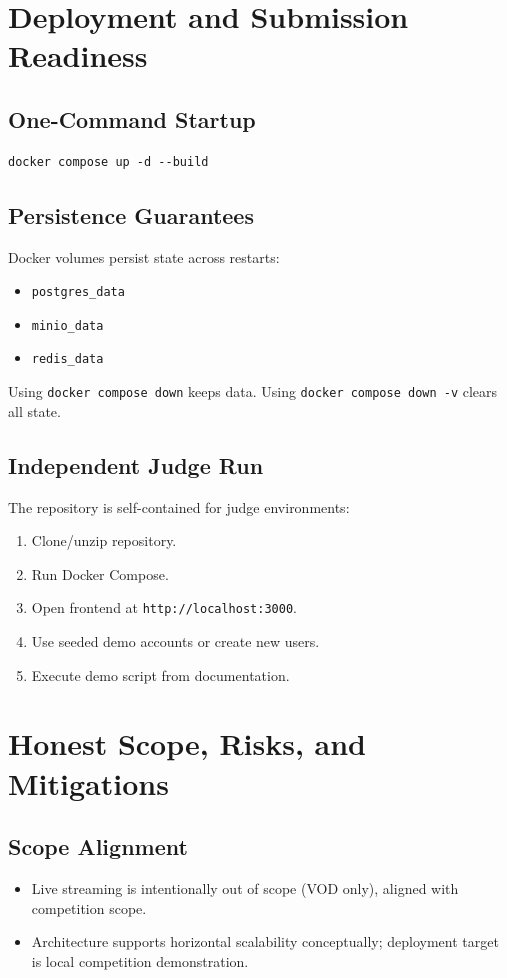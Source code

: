 \documentclass[11pt,a4paper]{article}
\begin{document}
\section{Deployment and Submission Readiness}
\subsection{One-Command Startup}
\begin{lstlisting}[style=plain]
docker compose up -d --build
\end{lstlisting}

\subsection{Persistence Guarantees}
Docker volumes persist state across restarts:
\begin{itemize}[leftmargin=1.2em]
  \item \texttt{postgres\_data}
  \item \texttt{minio\_data}
  \item \texttt{redis\_data}
\end{itemize}
Using \texttt{docker compose down} keeps data. Using \texttt{docker compose down -v} clears all state.

\subsection{Independent Judge Run}
The repository is self-contained for judge environments:
\begin{enumerate}[leftmargin=1.4em]
  \item Clone/unzip repository.
  \item Run Docker Compose.
  \item Open frontend at \texttt{http://localhost:3000}.
  \item Use seeded demo accounts or create new users.
  \item Execute demo script from documentation.
\end{enumerate}

\section{Honest Scope, Risks, and Mitigations}
\subsection{Scope Alignment}
\begin{itemize}[leftmargin=1.2em]
  \item Live streaming is intentionally out of scope (VOD only), aligned with competition scope.
  \item Architecture supports horizontal scalability conceptually; deployment target is local competition demonstration.
\end{itemize}
\end{document}
